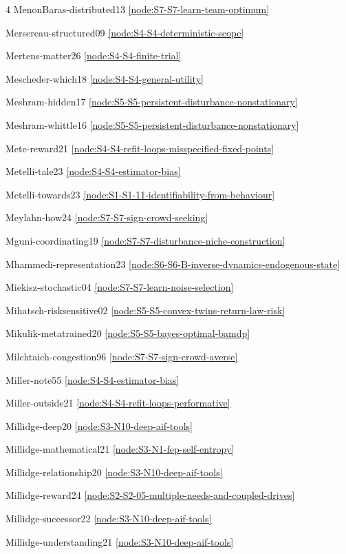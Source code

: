 \documentclass[10pt]{article}
\begin{document}
{\begin{multicols}{4}
MenonBaras-distributed13 \hfill \ref{node:S7-S7-learn-team-optimum}\par
Mersereau-structured09 \hfill \ref{node:S4-S4-deterministic-scope}\par
Mertens-matter26 \hfill \ref{node:S4-S4-finite-trial}\par
Mescheder-which18 \hfill \ref{node:S4-S4-general-utility}\par
Meshram-hidden17 \hfill \ref{node:S5-S5-persistent-disturbance-nonstationary}\par
Meshram-whittle16 \hfill \ref{node:S5-S5-persistent-disturbance-nonstationary}\par
Mete-reward21 \hfill \ref{node:S4-S4-refit-loops-misspecified-fixed-points}\par
Metelli-tale23 \hfill \ref{node:S4-S4-estimator-bias}\par
Metelli-towards23 \hfill \ref{node:S1-S1-11-identifiability-from-behaviour}\par
Meylahn-how24 \hfill \ref{node:S7-S7-sign-crowd-seeking}\par
Mguni-coordinating19 \hfill \ref{node:S7-S7-disturbance-niche-construction}\par
Mhammedi-representation23 \hfill \ref{node:S6-S6-B-inverse-dynamics-endogenous-state}\par
Miekisz-stochastic04 \hfill \ref{node:S7-S7-learn-noise-selection}\par
Mihatsch-risksensitive02 \hfill \ref{node:S5-S5-convex-twins-return-law-risk}\par
Mikulik-metatrained20 \hfill \ref{node:S5-S5-bayes-optimal-bamdp}\par
Milchtaich-congestion96 \hfill \ref{node:S7-S7-sign-crowd-averse}\par
Miller-note55 \hfill \ref{node:S4-S4-estimator-bias}\par
Miller-outside21 \hfill \ref{node:S4-S4-refit-loops-performative}\par
Millidge-deep20 \hfill \ref{node:S3-N10-deep-aif-tools}\par
Millidge-mathematical21 \hfill \ref{node:S3-N1-fep-self-entropy}\par
Millidge-relationship20 \hfill \ref{node:S3-N10-deep-aif-tools}\par
Millidge-reward24 \hfill \ref{node:S2-S2-05-multiple-needs-and-coupled-drives}\par
Millidge-successor22 \hfill \ref{node:S3-N10-deep-aif-tools}\par
Millidge-understanding21 \hfill \ref{node:S3-N10-deep-aif-tools}\par

\end{multicols}}
\end{document}
